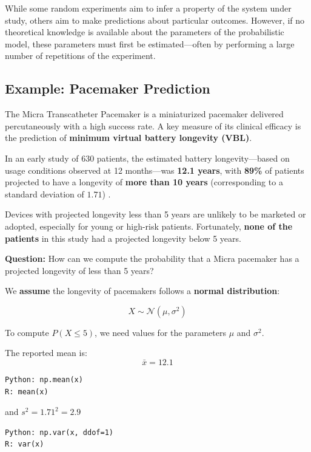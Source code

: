 \documentclass[
]{book}
\begin{document}
While some random experiments aim to infer a property of the system under study, others aim to make predictions about particular outcomes. However, if no theoretical knowledge is available about the parameters of the probabilistic model, these parameters must first be estimated---often by performing a large number of repetitions of the experiment.

\hypertarget{example-pacemaker-prediction}{%
\subsection{\texorpdfstring{\textbf{Example: Pacemaker Prediction}}{Example: Pacemaker Prediction}}\label{example-pacemaker-prediction}}

The Micra Transcatheter Pacemaker is a miniaturized pacemaker delivered percutaneously with a high success rate. A key measure of its clinical efficacy is the prediction of \textbf{minimum virtual battery longevity (VBL)}.

In an early study of 630 patients, the estimated battery longevity---based on usage conditions observed at 12 months---was \textbf{12.1 years}, with \textbf{89\%} of patients projected to have a longevity of \textbf{more than 10 years} (corresponding to a standard deviation of \(1.71\)) \citep{Duray2017Micra12mo}.

Devices with projected longevity less than 5 years are unlikely to be marketed or adopted, especially for young or high-risk patients. Fortunately, \textbf{none of the patients} in this study had a projected longevity below 5 years.

\textbf{Question:} How can we compute the probability that a Micra pacemaker has a projected longevity of less than 5 years?

We \textbf{assume} the longevity of pacemakers follows a \textbf{normal distribution}:

\[
X \sim \mathcal{N}(\mu, \sigma^2)
\]

To compute \(P(X \leq 5)\), we need values for the parameters \(\mu\) and \(\sigma^2\).

The reported mean is:\\
\[
  \bar{x} = 12.1
  \]

\begin{verbatim}
Python: np.mean(x)
R: mean(x)
\end{verbatim}

and \(s^2=1.71^2=2.9\)

\begin{verbatim}
Python: np.var(x, ddof=1)
R: var(x)
\end{verbatim}
\end{document}
